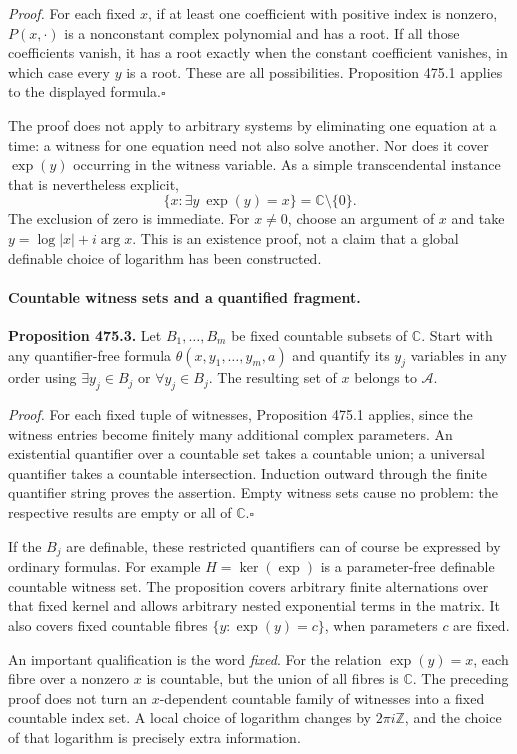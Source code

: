 \documentclass[11pt]{article}
\begin{document}
\emph{Proof.}
For each fixed $x$, if at least one coefficient with positive index is
nonzero, $P(x,\cdot)$ is a nonconstant complex polynomial and has a
root. If all those coefficients vanish, it has a root exactly when the
constant coefficient vanishes, in which case every $y$ is a root.
These are all possibilities. Proposition 475.1 applies to the displayed
formula.\hfill$\square$

The proof does not apply to arbitrary systems by eliminating one equation
at a time: a witness for one equation need not also solve another. Nor
does it cover $\exp(y)$ occurring in the witness variable. As a simple
transcendental instance that is nevertheless explicit,
\[
 \{x:\exists y\ \exp(y)=x\}=\mathbb C\setminus\{0\}.
\]
The exclusion of zero is immediate. For $x\ne0$, choose an argument of
$x$ and take $y=\log|x|+i\arg x$. This is an existence proof, not a
claim that a global definable choice of logarithm has been constructed.

\paragraph{Countable witness sets and a quantified fragment.}
\textbf{Proposition 475.3.} Let $B_1,\ldots,B_m$ be fixed countable
subsets of $\mathbb C$. Start with any quantifier-free formula
$\theta(x,y_1,\ldots,y_m,a)$ and quantify its $y_j$ variables in any
order using $\exists y_j\in B_j$ or $\forall y_j\in B_j$.
The resulting set of $x$ belongs to $\mathcal A$.

\emph{Proof.}
For each fixed tuple of witnesses, Proposition 475.1 applies, since the
witness entries become finitely many additional complex parameters.
An existential quantifier over a countable set takes a countable union;
a universal quantifier takes a countable intersection. Induction outward
through the finite quantifier string proves the assertion. Empty witness
sets cause no problem: the respective results are empty or all of
$\mathbb C$.\hfill$\square$

If the $B_j$ are definable, these restricted quantifiers can of course
be expressed by ordinary formulas. For example $H=\ker(\exp)$ is a
parameter-free definable countable witness set. The proposition covers
arbitrary finite alternations over that fixed kernel and allows arbitrary
nested exponential terms in the matrix. It also covers fixed countable
fibres $\{y:\exp(y)=c\}$, when parameters $c$ are fixed.

An important qualification is the word \emph{fixed}. For the relation
$\exp(y)=x$, each fibre over a nonzero $x$ is countable, but the union
of all fibres is $\mathbb C$. The preceding proof does not turn
an $x$-dependent countable family of witnesses into a fixed countable
index set. A local choice of logarithm changes by $2\pi i\mathbb Z$,
and the choice of that logarithm is precisely extra information.
\end{document}
